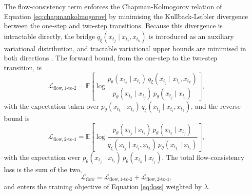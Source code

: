 The flow-consistency term enforces the Chapman-Kolmogorov relation of Equation \ref{eq:chapmankolmogorov} by minimising the Kullback-Leibler divergence between the one-step and two-step transitions. Because this divergence is intractable directly, the bridge $q_\xi(x_{t_j} \mid x_{t_i}, x_{t_k})$ is introduced as an auxiliary variational distribution, and tractable variational upper bounds are minimised in both directions \parencite{Kiyohara2025SNF}. The forward bound, from the one-step to the two-step transition, is
\begin{equation}
    \label{eq:flow12}
    \mathcal{L}_\mathrm{flow, 1\text{-}to\text{-}2} = \mathbb{E}\left[\log \frac{p_\theta(x_{t_k} \mid x_{t_i})\, q_\xi(x_{t_j} \mid x_{t_i}, x_{t_k})}{p_\theta(x_{t_k} \mid x_{t_j})\, p_\theta(x_{t_j} \mid x_{t_i})}\right],
\end{equation}
with the expectation taken over $p_\theta(x_{t_k} \mid x_{t_i})\,q_\xi(x_{t_j} \mid x_{t_i}, x_{t_k})$, and the reverse bound is
\begin{equation}
    \label{eq:flow21}
    \mathcal{L}_\mathrm{flow, 2\text{-}to\text{-}1} = \mathbb{E}\left[\log \frac{p_\theta(x_{t_j} \mid x_{t_i})\, p_\theta(x_{t_k} \mid x_{t_j})}{q_\xi(x_{t_j} \mid x_{t_i}, x_{t_k})\, p_\theta(x_{t_k} \mid x_{t_i})}\right],
\end{equation}
with the expectation over $p_\theta(x_{t_j} \mid x_{t_i})\,p_\theta(x_{t_k} \mid x_{t_j})$. The total flow-consistency loss is the sum of the two,
\begin{equation}
    \label{eq:flowtotal}
    \mathcal{L}_\mathrm{flow} = \mathcal{L}_\mathrm{flow, 1\text{-}to\text{-}2} + \mathcal{L}_\mathrm{flow, 2\text{-}to\text{-}1},
\end{equation}
and enters the training objective of Equation \ref{eq:loss} weighted by $\lambda$.